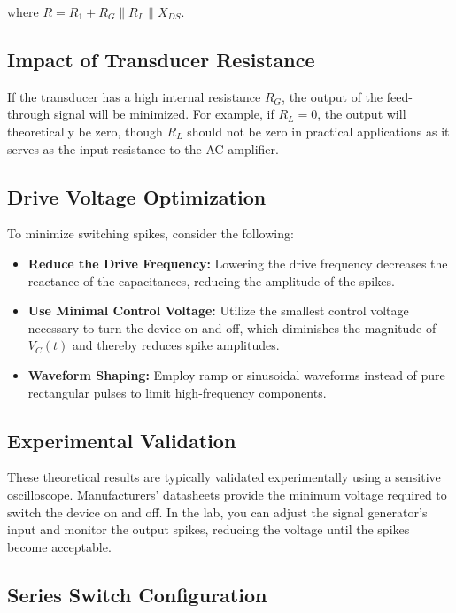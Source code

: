 \documentclass[a4paper,9pt,twoside,openany,twocolumn]{memoir}
\begin{document}
where \( R = R_1 + R_G \parallel R_L \parallel X_{DS} \).

\subsection{Impact of Transducer Resistance}

If the transducer has a high internal resistance \( R_G \), the output of the feed-through signal will be minimized. For example, if \( R_L = 0 \), the output will theoretically be zero, though \( R_L \) should not be zero in practical applications as it serves as the input resistance to the AC amplifier.

\subsection{Drive Voltage Optimization}

To minimize switching spikes, consider the following:

\begin{itemize}
    \item \textbf{Reduce the Drive Frequency:} Lowering the drive frequency decreases the reactance of the capacitances, reducing the amplitude of the spikes.
    
    \item \textbf{Use Minimal Control Voltage:} Utilize the smallest control voltage necessary to turn the device on and off, which diminishes the magnitude of \( V_C(t) \) and thereby reduces spike amplitudes.
    
    \item \textbf{Waveform Shaping:} Employ ramp or sinusoidal waveforms instead of pure rectangular pulses to limit high-frequency components.
\end{itemize}

\subsection{Experimental Validation}

These theoretical results are typically validated experimentally using a sensitive oscilloscope. Manufacturers' datasheets provide the minimum voltage required to switch the device on and off. In the lab, you can adjust the signal generator's input and monitor the output spikes, reducing the voltage until the spikes become acceptable.

\subsection{Series Switch Configuration}
\end{document}
